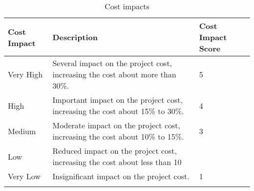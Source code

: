 \begin{longtable}[H]{l >{\raggedright\arraybackslash}p{7.8cm} p{3.5cm}}
	
	\toprule[2pt]
	
	\textbf{Cost Impact} &  \textbf{Description}  & \textbf{Cost Impact Score} \\
	
	\midrule [1.5pt]
	\endhead
	
	Very High & Several impact on the project cost, increasing the cost about more than 30\%. & 5
	\vspace{0.2cm} \\
	
	\midrule
	
	High & Important impact on the project cost, increasing the cost about 15\% to 30\%. & 4
	\vspace{0.2cm} \\
	
	\midrule
	
	Medium & Moderate impact on the project cost, increasing the cost about 10\% to 15\%. & 3
	\vspace{0.2cm} \\

	\midrule

	Low & Reduced impact on the project cost, increasing the cost about  less than 10%
	\vspace{0.2cm} \\

	\midrule

	Very Low & Insignificant impact on the project cost. & 1
	\vspace{0.2cm} \\
		
	\bottomrule[2pt]
	
	\caption{Cost impacts}

\end{longtable}